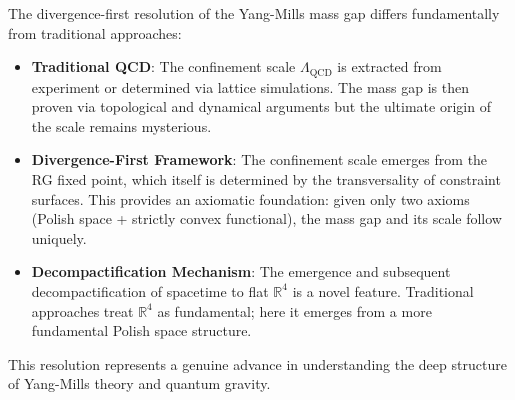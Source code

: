 \begin{remark}
\label{rem:noveltyThermodynamicLimit}

The divergence-first resolution of the Yang-Mills mass gap differs
fundamentally from traditional approaches:

\begin{itemize}

\item \textbf{Traditional QCD}: The confinement scale $\Lambda_{\mathrm{QCD}}$
is extracted from experiment or determined via lattice simulations. The
mass gap is then proven via topological and dynamical arguments but the
ultimate origin of the scale remains mysterious.

\item \textbf{Divergence-First Framework}: The confinement scale emerges
from the RG fixed point, which itself is determined by the transversality
of constraint surfaces. This provides an axiomatic foundation: given only
two axioms (Polish space + strictly convex functional), the mass gap and
its scale follow uniquely.

\item \textbf{Decompactification Mechanism}: The emergence and subsequent
decompactification of spacetime to flat $\mathbb{R}^4$ is a novel feature.
Traditional approaches treat $\mathbb{R}^4$ as fundamental; here it
emerges from a more fundamental Polish space structure.

\end{itemize}

This resolution represents a genuine advance in understanding the deep
structure of Yang-Mills theory and quantum gravity.

\end{remark}

